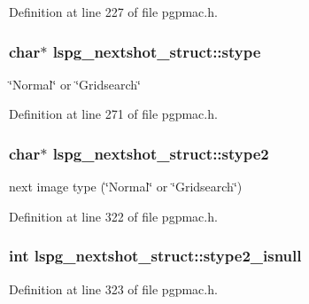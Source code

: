 Definition at line 227 of file pgpmac.\-h.

\hypertarget{structlspg__nextshot__struct_ab5a70b189c2fe516ca0c84bd06f3e564}{
\subsubsection[{stype}]{\setlength{\rightskip}{0pt plus 5cm}char$\ast$ lspg\-\_\-nextshot\-\_\-struct\-::stype}}\label{structlspg__nextshot__struct_ab5a70b189c2fe516ca0c84bd06f3e564}


\char`\"{}\-Normal\char`\"{} or \char`\"{}\-Gridsearch\char`\"{} 



Definition at line 271 of file pgpmac.\-h.

\hypertarget{structlspg__nextshot__struct_ae08ef74ea76e6e099a3ff6c7f845d337}{
\subsubsection[{stype2}]{\setlength{\rightskip}{0pt plus 5cm}char$\ast$ lspg\-\_\-nextshot\-\_\-struct\-::stype2}}\label{structlspg__nextshot__struct_ae08ef74ea76e6e099a3ff6c7f845d337}


next image type (\char`\"{}\-Normal\char`\"{} or \char`\"{}\-Gridsearch\char`\"{}) 



Definition at line 322 of file pgpmac.\-h.

\hypertarget{structlspg__nextshot__struct_a203e29ed0bb403aaab6d7f95f690cc0d}{
\subsubsection[{stype2\-\_\-isnull}]{\setlength{\rightskip}{0pt plus 5cm}int lspg\-\_\-nextshot\-\_\-struct\-::stype2\-\_\-isnull}}\label{structlspg__nextshot__struct_a203e29ed0bb403aaab6d7f95f690cc0d}


Definition at line 323 of file pgpmac.\-h.

